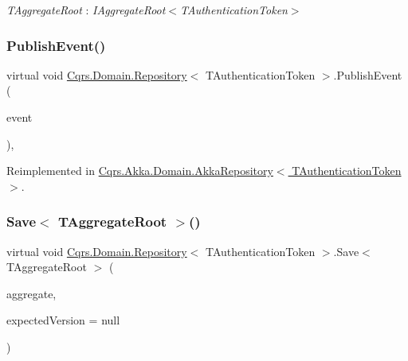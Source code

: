 \begin{Desc}
\item[Type Constraints]\begin{description}
\item[{\em T\+Aggregate\+Root} : {\em I\+Aggregate\+Root$<$T\+Authentication\+Token$>$}]\end{description}
\end{Desc}
\mbox{\label{classCqrs_1_1Domain_1_1Repository_aef4df40c39f3edc0f9259089cbd3400e}} 
\subsubsection{\texorpdfstring{Publish\+Event()}{PublishEvent()}}
{\footnotesize\ttfamily virtual void \hyperlink{classCqrs_1_1Domain_1_1Repository}{Cqrs.\+Domain.\+Repository}$<$ T\+Authentication\+Token $>$.Publish\+Event (\begin{DoxyParamCaption}\item[{\hyperlink{interfaceCqrs_1_1Events_1_1IEvent}{I\+Event}$<$ T\+Authentication\+Token $>$ @}]{event }\end{DoxyParamCaption})\hspace{0.3cm}{\ttfamily [protected]}, {\ttfamily [virtual]}}



Reimplemented in \hyperlink{classCqrs_1_1Akka_1_1Domain_1_1AkkaRepository_ae0ead40945c7600a3f3f38fa302ef35f}{Cqrs.\+Akka.\+Domain.\+Akka\+Repository$<$ T\+Authentication\+Token $>$}.

\mbox{\label{classCqrs_1_1Domain_1_1Repository_a7795a0bd435022c686306fbc76311694}} 
\subsubsection{\texorpdfstring{Save$<$ T\+Aggregate\+Root $>$()}{Save< TAggregateRoot >()}}
{\footnotesize\ttfamily virtual void \hyperlink{classCqrs_1_1Domain_1_1Repository}{Cqrs.\+Domain.\+Repository}$<$ T\+Authentication\+Token $>$.Save$<$ T\+Aggregate\+Root $>$ (\begin{DoxyParamCaption}\item[{T\+Aggregate\+Root}]{aggregate,  }\item[{int?}]{expected\+Version = {\ttfamily null} }\end{DoxyParamCaption})\hspace{0.3cm}{\ttfamily [virtual]}}



